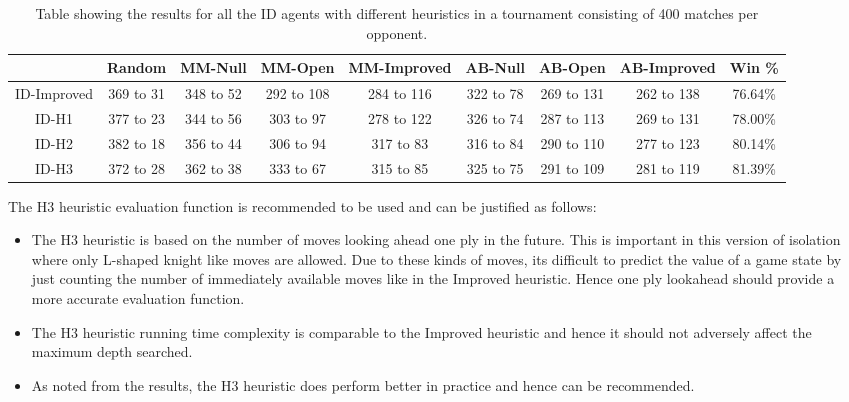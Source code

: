 \documentclass{article} %
\begin{document}
\begin{table}[!ht]
    \caption{Table showing the results for all the ID agents with different
           heuristics in a tournament consisting of 400 matches per opponent.}
    \label{table2}
    \centering
    \bgroup
	\def\arraystretch{1.5}%
    \tabcolsep=0.11cm
    \begin{tabular}{|c|c|c|c|c|c|c|c|c|}
        \hline
            & Random & MM-Null & MM-Open & MM-Improved & AB-Null & AB-Open & AB-Improved & Win \% \\
        \hline
        ID-Improved & 369 to 31 & 348 to 52 & 292 to 108 & 284 to 116 & 322 to 78 & 269 to 131 & 262 to 138  & 76.64\% \\
        \hline
        ID-H1 & 377 to 23 & 344 to 56 & 303 to 97  & 278 to 122 & 326 to 74 & 287 to 113 & 269 to 131 & 78.00\% \\
        \hline
        ID-H2 & 382 to 18 & 356 to 44 & 306 to 94 & 317 to 83 & 316 to 84 & 290 to 110 & 277 to 123 & 80.14\% \\
        \hline
        ID-H3 & 372 to 28 & 362 to 38 & 333 to 67 & 315 to 85 & 325 to 75 & 291 to 109 & 281 to 119 & 81.39\% \\
        \hline
    \end{tabular}
    \egroup
\end{table}

The H3 heuristic evaluation function is recommended to be used and can be justified as follows:
\begin{itemize}
    \item The H3 heuristic is based on the number of moves looking ahead one ply in the future. This is important in this version of isolation where only L-shaped knight like moves are allowed.
    Due to these kinds of moves, its difficult to predict the value of a game state by just counting the number of immediately available moves like in the Improved heuristic. Hence one ply lookahead should provide a more accurate evaluation function.
    \item The H3 heuristic running time complexity is comparable to the Improved heuristic and hence it should not adversely affect the maximum depth searched.
    \item As noted from the results, the H3 heuristic does perform better in practice and hence can be recommended.
\end{itemize}




% 
% 
\end{document}
